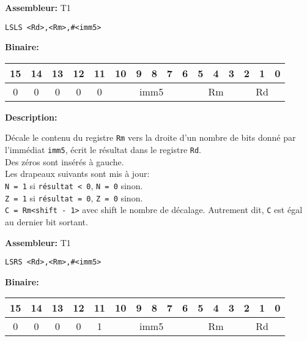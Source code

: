 \documentclass{article}
\begin{document}
    \textbf{Assembleur:} T1

    \begin{lstlisting}
LSLS <Rd>,<Rm>,#<imm5>
    \end{lstlisting}

    \textbf{Binaire:}

    \begin{tabular}{| c c c c c c c c c c c c c c c c |}
        \hline
        15 & 14 & 13 & \multicolumn{1}{|c}{12} & 11 & \multicolumn{1}{|c}{10} & 9 & 8 & 7 & 6 & \multicolumn{1}{|c}{5} & 4 & 3 & \multicolumn{1}{|c}{2} & 1 & 0 \\
        \hline
        0 & 0 & 0 & \multicolumn{1}{|c}{0} & 0 & \multicolumn{5}{|c|}{imm5} & \multicolumn{3}{|c|}{Rm} & \multicolumn{3}{|c|}{Rd} \\
        \hline
    \end{tabular}


    \textbf{Description: }

    Décale le contenu du registre \texttt{Rm} vers la droite d'un nombre de bits donné par l'immédiat \texttt{imm5}, écrit le résultat dans le registre \texttt{Rd}.\\
    Des zéros sont insérés à gauche.\\
    Les drapeaux suivants sont mis à jour:\\
    \texttt{N = 1} si \texttt{résultat < 0}, \texttt{N = 0} sinon.\\
    \texttt{Z = 1} si \texttt{résultat = 0}, \texttt{Z = 0} sinon.\\
    \texttt{C = Rm<shift - 1>} avec shift le nombre de décalage.
    Autrement dit, \texttt{C} est égal au dernier bit sortant.

    \textbf{Assembleur:} T1

    \begin{lstlisting}
LSRS <Rd>,<Rm>,#<imm5>
    \end{lstlisting}

    \textbf{Binaire:}

    \begin{tabular}{| c c c c c c c c c c c c c c c c |}
        \hline
        15 & 14 & 13 & \multicolumn{1}{|c}{12} & 11 & \multicolumn{1}{|c}{10} & 9 & 8 & 7 & 6 & \multicolumn{1}{|c}{5} & 4 & 3 & \multicolumn{1}{|c}{2} & 1 & 0 \\
        \hline
        0 & 0 & 0 & \multicolumn{1}{|c}{0} & 1 & \multicolumn{5}{|c|}{imm5} & \multicolumn{3}{|c|}{Rm} & \multicolumn{3}{|c|}{Rd} \\
        \hline
    \end{tabular}
\end{document}
